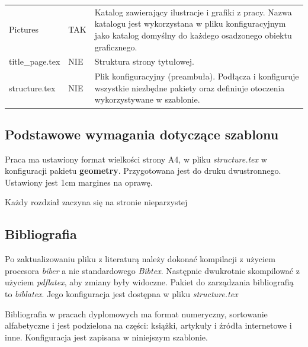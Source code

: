 \begin{table}[h]
\begin{tabular}{p{}|p{} | p{}}
        Pictures             & TAK             & Katalog zawierający ilustracje i grafiki z pracy. Nazwa katalogu jest wykorzystana w pliku konfiguracyjnym jako katalog domyślny do każdego osadzonego obiektu graficznego. \\
        title\_page.tex      & NIE             & Struktura strony tytułowej.                                                                                                                                                 \\
        structure.tex        & NIE             & Plik konfiguracyjny (preambuła). Podłącza i konfiguruje wszystkie niezbędne pakiety oraz definiuje otoczenia wykorzystywane w szablonie.                                    \\
        \bottomrule
    \end{tabular}
    \label{tab:1}
\end{table}

\subsection{Podstawowe wymagania dotyczące szablonu}

Praca ma ustawiony format wielkości strony A4, w pliku {\em structure.tex} w konfiguracji pakietu {\bf geometry}. Przygotowana jest do druku dwustronnego. Ustawiony jest 1cm margines na oprawę.

 Każdy rozdział zaczyna się na stronie nieparzystej

\subsection{Bibliografia}

Po zaktualizowaniu pliku z literaturą należy dokonać kompilacji z użyciem procesora {\em biber} a nie standardowego  {\em Bibtex}. Następnie dwukrotnie skompilować z użyciem {\em pdflatex}, aby zmiany były widoczne. Pakiet do zarządzania bibliografią to {\em biblatex}. Jego konfiguracja jest dostępna w pliku {\em structure.tex}

Bibliografia w pracach dyplomowych ma format numeryczny, sortowanie alfabetyczne i jest podzielona na części: książki, artykuły i źródła internetowe i inne. Konfiguracja jest zapisana w niniejszym szablonie.






